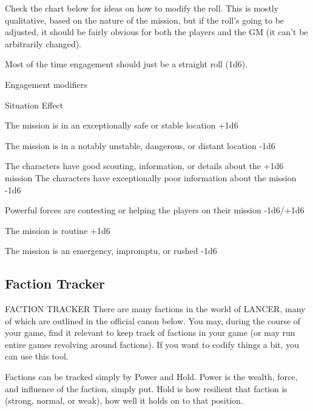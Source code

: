 Check the chart below for ideas on how to modify the roll. This is mostly qualitative, based on  
the nature of the mission, but if the roll’s going to be adjusted, it should be fairly obvious for both  
the players and the GM (it can’t be arbitrarily changed).
 

Most of the time engagement should just be a straight roll (1d6).  

                                         Engagement modifiers
 

                                                                                                          


 Situation                                                                             Effect 

 The mission is in an exceptionally safe or stable location                            +1d6 

 The mission is in a notably unstable, dangerous, or distant location                  -1d6 

 The characters have good scouting, information, or details about the                  +1d6 
 mission 
 The characters have exceptionally poor information about the mission                  -1d6 

 Powerful forces are contesting or helping the players on their mission                -1d6/+1d6 

 The mission is routine                                                                +1d6 

 The mission is an emergency, impromptu, or rushed                                     -1d6 

\subsection{Faction Tracker}
                                       FACTION TRACKER  
There are many factions in the world of LANCER, many of which are outlined in the official canon  
below. You may, during the course of your game, find it relevant to keep track of factions in your  
game (or may run entire games revolving around factions). If you want to codify things a bit, you  
can use this tool.  

Factions can be tracked simply by Power and Hold. Power is the wealth, force, and influence of  
the faction, simply put. Hold is how resilient that faction is (strong, normal, or weak), how well it  
holds on to that position.  


